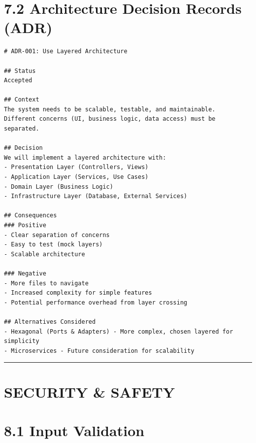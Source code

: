 \hypertarget{architecture-decision-records-adr}{%
\section{7.2 Architecture Decision Records
(ADR)}\label{architecture-decision-records-adr}}

\begin{lstlisting}
# ADR-001: Use Layered Architecture

## Status
Accepted

## Context
The system needs to be scalable, testable, and maintainable.
Different concerns (UI, business logic, data access) must be separated.

## Decision
We will implement a layered architecture with:
- Presentation Layer (Controllers, Views)
- Application Layer (Services, Use Cases)
- Domain Layer (Business Logic)
- Infrastructure Layer (Database, External Services)

## Consequences
### Positive
- Clear separation of concerns
- Easy to test (mock layers)
- Scalable architecture

### Negative
- More files to navigate
- Increased complexity for simple features
- Potential performance overhead from layer crossing

## Alternatives Considered
- Hexagonal (Ports & Adapters) - More complex, chosen layered for simplicity
- Microservices - Future consideration for scalability
\end{lstlisting}

\begin{center}\rule{0.5\linewidth}{0.5pt}\end{center}

\hypertarget{security-safety}{%
\section{SECURITY \& SAFETY}\label{security-safety}}

\hypertarget{input-validation}{%
\section{8.1 Input Validation}\label{input-validation}}

